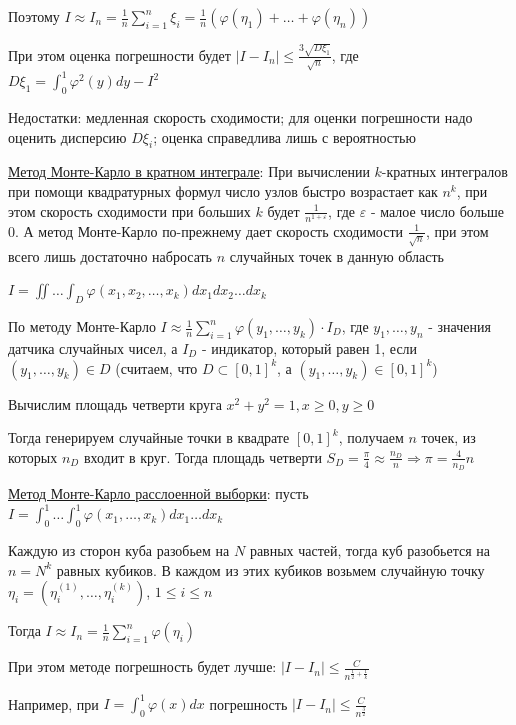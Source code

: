 \documentclass[12pt]{article}
\begin{document}
\begin{enumerate}
    Поэтому $I \approx I_n = \frac{1}{n} \sum_{i = 1}^n \xi_i = \frac{1}{n} (\varphi(\eta_1) + \dots + \varphi(\eta_n))$

    При этом оценка погрешности будет $|I - I_n| \leq \frac{3\sqrt{D \xi_1}}{\sqrt{n}}$, где $D \xi_1 = \int_0^1 \varphi^2(y) dy - I^2$

    Недостатки: медленная скорость сходимости; для оценки погрешности надо оценить дисперсию $D\xi_i$; оценка справедлива лишь с вероятностью

    
    \hyperlink{monte_carlo_k_integral}{Метод Монте-Карло в кратном интеграле}: При вычислении $k$-кратных интегралов при помощи квадратурных формул число узлов быстро возрастает как $n^k$, при этом скорость сходимости при больших $k$ будет $\frac{1}{n^{1 + \varepsilon}}$, где $\varepsilon$ - малое число больше 0. А метод Монте-Карло по-прежнему дает скорость сходимости $\frac{1}{\sqrt{n}}$, при этом всего лишь достаточно набросать $n$ случайных точек в данную область

    $I = \iint \dots \int_D \varphi(x_1, x_2, \dots, x_k) dx_1 dx_2 \dots dx_k$

    По методу Монте-Карло $I \approx \frac{1}{n} \sum_{i = 1}^n \varphi(y_1, \dots, y_k) \cdot I_D$, где $y_1, \dots, y_n$ - значения датчика случайных чисел, а $I_D$ - индикатор, который равен 1, если $(y_1, \dots, y_k) \in D$ (считаем, что $D \subset [0, 1]^k$, а $(y_1, \dots, y_k) \in [0, 1]^k$) 

    \Ex Вычислим площадь четверти круга $x^2 + y^2 = 1, x \geq 0, y \geq 0$

    Тогда генерируем случайные точки в квадрате $[0, 1]^k$, получаем $n$ точек, из которых $n_D$ входит в круг. Тогда площадь четверти $S_D = \frac{\pi}{4} \approx \frac{n_D}{n} \Longrightarrow \pi = \frac{4}{n_D}{n}$

    
    \hyperlink{monte_carlo_2}{Метод Монте-Карло расслоенной выборки}: пусть $I = \int_0^1 \dots \int_0^1 \varphi(x_1, \dots, x_k) dx_1 \dots dx_k$

    Каждую из сторон куба разобьем на $N$ равных частей, тогда куб разобьется на $n = N^k$ равных кубиков. В каждом из этих кубиков возьмем случайную точку $\eta_i = (\eta_i^{(1)}, \dots, \eta_i^{(k)})$, $1 \leq i \leq n$

    Тогда $I \approx I_n = \frac{1}{n} \sum_{i = 1}^n \varphi(\eta_i)$

    При этом методе погрешность будет лучше: $|I - I_n| \leq \frac{C}{n^{\frac{1}{2} + \frac{1}{k}}}$

    Например, при $I = \int_0^1 \varphi(x) dx$ погрешность $|I - I_n| \leq \frac{C}{n^\frac{3}{2}}$


\end{enumerate}
\end{document}

